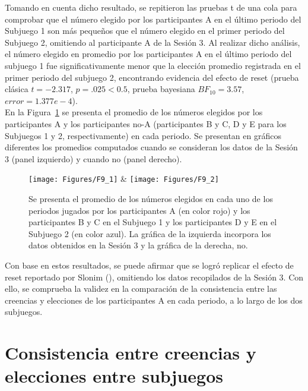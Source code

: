 Tomando en cuenta dicho resultado, se repitieron las pruebas t de una cola para comprobar que el número elegido por los participantes A en el último periodo del Subjuego 1 son más pequeños que el número elegido en el primer periodo del Subjuego 2, omitiendo al participante A de la Sesión 3. Al realizar dicho análisis, el número elegido en promedio por los participantes A en el último periodo del subjuego 1 fue significativamente menor que la elección promedio registrada en el primer periodo del subjuego 2, encontrando evidencia del efecto de reset (prueba clásica $t = -2.317$, $p = .025 < 0.5$, prueba bayesiana $BF_10 = 3.57$, $error = 1.377e-4$).\\

En la Figura~\ref{fig:ParticipantesA_promedio} se presenta el promedio de los números elegidos por los participantes A y los participantes no-A (participantes B y C, D y E para los Subjuegos 1 y 2, respectivamente) en cada periodo. Se presentan en gráficos diferentes los promedios computados cuando se consideran los datos de la Sesión 3 (panel izquierdo) y cuando no (panel derecho).\\
  
\begin{figure}[h]
\centering
\texttt{[image: Figures/F9\_1]} & \texttt{[image: Figures/F9\_2]} 
\decoRule
\caption[Promedio de los números elegidos por los participantes A y no-A en cada uno de los periodos jugados]{Se presenta el promedio de los números elegidos en cada uno de los periodos jugados por los participantes A (en color rojo) y los participantes B y C en el Subjuego 1 y los participantes D y E en el Subjuego 2 (en color azul). La gráfica de la izquierda incorpora los datos obtenidos en la Sesión 3 y la gráfica de la derecha, no.}
\label{fig:ParticipantesA_promedio}
\end{figure}  

Con base en estos resultados, se puede afirmar que se logró replicar el efecto de reset reportado por Slonim (\citeyear{Slonim}), omitiendo los datos recopilados de la Sesión 3. Con ello, se comprueba la validez en la comparación de la consistencia entre las creencias y elecciones de los participantes A en cada periodo, a lo largo de los dos subjuegos.\\

\section{Consistencia entre creencias y elecciones entre subjuegos}\\

